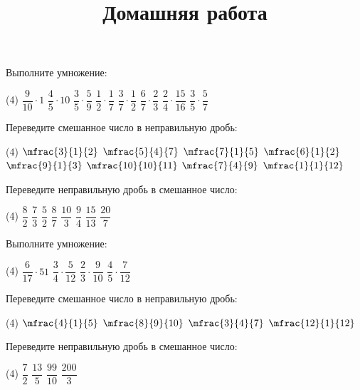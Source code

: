 \begin{consultation}
	\begin{listofex}
		\item Выполните умножение:
		\begin{tasks}(4)
			\task \( \dfrac{9}{10}\cdot1 \)
			\task \( \dfrac{4}{5}\cdot10 \)
			\task \( \dfrac{3}{5}\cdot\dfrac{5}{9} \)
			\task \( \dfrac{1}{2}\cdot\dfrac{1}{7} \)
			\task \( \dfrac{3}{7}\cdot\dfrac{1}{2} \)
			\task \( \dfrac{6}{7}\cdot\dfrac{2}{3} \)
			\task \( \dfrac{2}{4}\cdot\dfrac{15}{16} \)
			\task \( \dfrac{3}{5}\cdot\dfrac{5}{7} \)
		\end{tasks}
		\item Переведите смешанное число в неправильную дробь:
		\begin{tasks}(4)
			\task \( \mfrac{3}{1}{2} \)
			\task \( \mfrac{5}{4}{7} \)
			\task \( \mfrac{7}{1}{5} \)
			\task \( \mfrac{6}{1}{2} \)
			\task \( \mfrac{9}{1}{3} \)
			\task \( \mfrac{10}{10}{11} \)
			\task \( \mfrac{7}{4}{9} \)
			\task \( \mfrac{1}{1}{12} \)
		\end{tasks}
		\item Переведите неправильную дробь в смешанное число:
		\begin{tasks}(4)
			\task \( \dfrac{8}{2} \)
			\task \( \dfrac{7}{3} \)
			\task \( \dfrac{5}{2} \)
			\task \( \dfrac{8}{7} \)
			\task \( \dfrac{10}{3} \)
			\task \( \dfrac{9}{4} \)
			\task \( \dfrac{15}{13} \)
			\task \( \dfrac{20}{7} \)
		\end{tasks}
	\end{listofex}
	\newpage
	\title{Домашняя работа}
	\begin{listofex}
		\item Выполните умножение:
		\begin{tasks}(4)
			\task \( \dfrac{6}{17}\cdot51 \)
			\task \( \dfrac{3}{4}\cdot\dfrac{5}{12} \)
			\task \( \dfrac{2}{3}\cdot\dfrac{9}{10} \)
			\task \( \dfrac{4}{5}\cdot\dfrac{7}{12} \)
		\end{tasks}
		\item Переведите смешанное число в неправильную дробь:
		\begin{tasks}(4)
			\task \( \mfrac{4}{1}{5} \)
			\task \( \mfrac{8}{9}{10} \)
			\task \( \mfrac{3}{4}{7} \)
			\task \( \mfrac{12}{1}{12} \)
		\end{tasks}
		\item Переведите неправильную дробь в смешанное число:
		\begin{tasks}(4)
			\task \( \dfrac{7}{2} \)
			\task \( \dfrac{13}{5} \)
			\task \( \dfrac{99}{10} \)
			\task \( \dfrac{200}{3} \)
		\end{tasks}
	\end{listofex}
\end{consultation}

